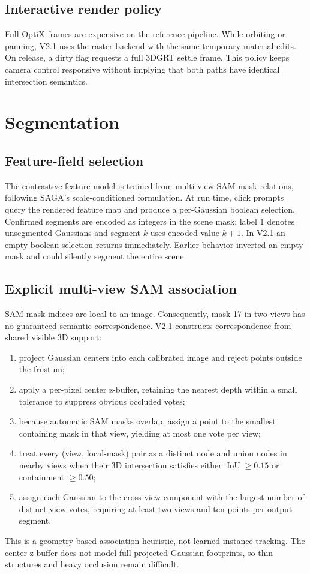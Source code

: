 \documentclass[10pt,twocolumn,a4paper]{article}
\begin{document}
\subsection{Interactive render policy}
Full OptiX frames are expensive on the reference pipeline. While orbiting or
panning, V2.1 uses the raster backend with the same temporary material edits.
On release, a dirty flag requests a full 3DGRT settle frame. This policy keeps
camera control responsive without implying that both paths have identical
intersection semantics.

\section{Segmentation}
\subsection{Feature-field selection}
The contrastive feature model is trained from multi-view SAM mask relations,
following SAGA's scale-conditioned formulation. At run time, click prompts
query the rendered feature map and produce a per-Gaussian boolean selection.
Confirmed segments are encoded as integers in the scene mask; label 1 denotes
unsegmented Gaussians and segment $k$ uses encoded value $k+1$. In V2.1 an
empty boolean selection returns immediately. Earlier behavior inverted an
empty mask and could silently segment the entire scene.

\subsection{Explicit multi-view SAM association}
SAM mask indices are local to an image. Consequently, mask 17 in two views has
no guaranteed semantic correspondence. V2.1 constructs correspondence from
shared visible 3D support:
\begin{enumerate}
  \item project Gaussian centers into each calibrated image and reject points
        outside the frustum;
  \item apply a per-pixel center z-buffer, retaining the nearest depth within a
        small tolerance to suppress obvious occluded votes;
  \item because automatic SAM masks overlap, assign a point to the smallest
        containing mask in that view, yielding at most one vote per view;
  \item treat every (view, local-mask) pair as a distinct node and union nodes
        in nearby views when their 3D intersection satisfies either
        $\operatorname{IoU}\ge0.15$ or containment $\ge0.50$;
  \item assign each Gaussian to the cross-view component with the largest
        number of distinct-view votes, requiring at least two views and ten
        points per output segment.
\end{enumerate}
This is a geometry-based association heuristic, not learned instance tracking.
The center z-buffer does not model full projected Gaussian footprints, so thin
structures and heavy occlusion remain difficult.
\end{document}
